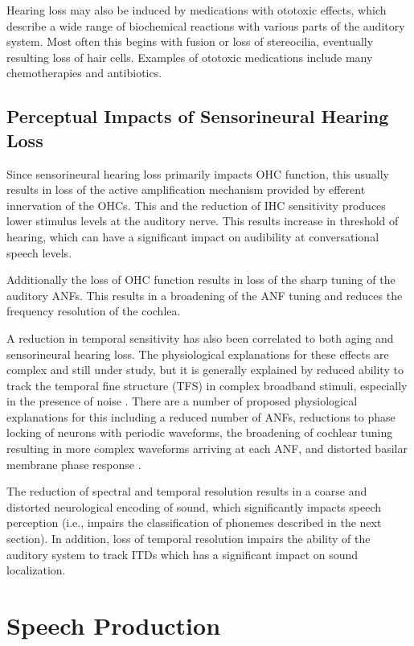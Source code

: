 Hearing loss may also be induced by medications with ototoxic effects, which describe a wide range of biochemical reactions with various parts of the auditory system. Most often this begins with fusion or loss of stereocilia, eventually resulting loss of hair cells. Examples of ototoxic medications include many chemotherapies and antibiotics.

\subsection{Perceptual Impacts of Sensorineural Hearing Loss} 

Since sensorineural hearing loss primarily impacts OHC function, this usually results in loss of the active amplification mechanism provided by efferent innervation of the OHCs. This and the reduction of IHC sensitivity produces lower stimulus levels at the auditory nerve. This results increase in threshold of hearing, which can have a significant impact on audibility at conversational speech levels.

Additionally the loss of OHC function results in loss of the sharp tuning of the auditory ANFs. This results in a broadening of the ANF tuning and reduces the frequency resolution of the cochlea.

A reduction in temporal sensitivity has also been correlated to both aging and sensorineural hearing loss. The physiological explanations for these effects are complex and still under study, but it is generally explained by reduced ability to track the temporal fine structure (TFS) in complex broadband stimuli, especially in the presence of noise \citep{xia2018effects}. There are a number of proposed physiological explanations for this including a reduced number of ANFs, reductions to phase locking of neurons with periodic waveforms, the broadening of cochlear tuning resulting in more complex waveforms arriving at each ANF, and distorted basilar membrane phase response  \citep{tsironis2024adaptation}.

The reduction of spectral and temporal resolution results in a coarse and distorted neurological encoding of sound, which significantly impacts speech perception (i.e., impairs the classification of phonemes described in the next section). In addition, loss of temporal resolution impairs the ability of the auditory system to track ITDs which has a significant impact on sound localization.

\section{Speech Production}


